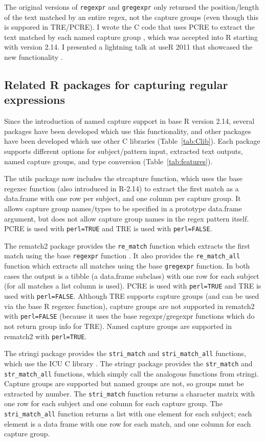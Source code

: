 The original versions of \verb|regexpr| and \verb|gregexpr| only
returned the position/length of the text matched by an entire regex,
not the capture groups (even though this is suppored in TRE/PCRE). I
wrote the C code that uses PCRE to extract the text matched by each
named capture group \citep{HockingBug2011}, which was accepted into R
starting with version 2.14. I presented a lightning talk at useR 2011
that showcased the new functionality \citep{HockingUseR2011}.

\subsection{Related R packages for capturing regular expressions}

Since the introduction of named capture support in base R version
2.14, several packages have been developed which use this
functionality, and other packages have been developed which use other
C libraries (Table~\ref{tab:Clib}). Each package supports different
options for subject/pattern input, extracted text outputs, named
capture groups, and type conversion (Table~\ref{tab:features}).

The utils package now includes the strcapture function, which uses the
base regexec function (also introduced in R-2.14) to extract the first
match as a data.frame with one row per subject, and one column per
capture group. It allows capture group names/types to be specified in
a prototype data.frame argument, but does not allow capture group
names in the regex pattern itself. PCRE is used with \verb|perl=TRUE|
and TRE is used with \verb|perl=FALSE|.
 
The rematch2 package provides the \verb|re_match| function which
extracts the first match using the base \verb|regexpr| function
\citep{rematch2}. It also provides the \verb|re_match_all| function
which extracts all matches using the base \verb|gregexpr| function. In
both cases the output is a tibble (a data.frame subclass) with one row
for each subject (for all matches a list column is used). PCRE is used
with \verb|perl=TRUE| and TRE is used with \verb|perl=FALSE|. Although
TRE supports capture groups (and can be used via the base R regexec
function), capture groups are not supported in rematch2 with
\verb|perl=FALSE| (because it uses the base regexpr/gregexpr functions
which do not return group info for TRE). Named capture groups are
supported in rematch2 with \verb|perl=TRUE|.

The stringi package provides the \verb|stri_match| and
\verb|stri_match_all| functions, which use the ICU C library
\citep{stringi}. The stringr package provides the \verb|str_match| and
\verb|str_match_all| functions, which simply call the analogous
functions from stringi. Capture groups are supported but named groups
are not, so groups must be extracted by number. The \verb|stri_match|
function returns a character matrix with one row for each subject and
one column for each capture group. The \verb|stri_match_all| function
returns a list with one element for each subject; each element is a
data frame with one row for each match, and one column for each
capture group.

